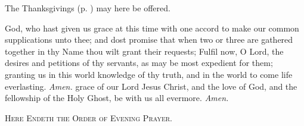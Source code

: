 \begin{rubric}
    The Thanksgivings (p. \pageref{thanksgiving}) may here be offered.
\end{rubric}
\vspace{-2ex}
 God, who hast given us grace at this time with one accord to make our common supplications unto thee; and dost promise that when two or three are gathered together in thy Name thou wilt grant their requests; Fulfil now, O Lord, the desires and petitions of thy servants, as may be most expedient for them; granting us in this world knowledge of thy truth, and in the world to come life everlasting. \textit{Amen.}
 grace of our Lord Jesus Christ, {} and the love of God, and the fellowship of the Holy Ghost, be with us all evermore. \textit{Amen.}\par
\begin{center}
    \textsc{Here Endeth the Order of Evening Prayer.}
\end{center}
